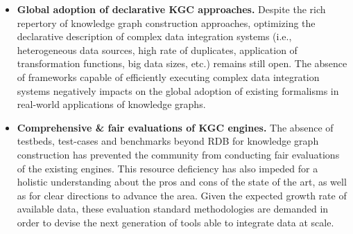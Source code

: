 \begin{itemize}
    \item \textbf{Global adoption of declarative KGC approaches.} Despite the rich repertory of knowledge graph construction approaches, optimizing the declarative description of complex data integration systems (i.e., heterogeneous data sources, high rate of duplicates, application of transformation functions, big data sizes, etc.) remains still open. The absence of frameworks capable of efficiently executing complex data integration systems negatively impacts on the global adoption of existing formalisms in real-world applications of knowledge graphs.
    \item \textbf{Comprehensive \& fair evaluations of KGC engines.} The absence of testbeds, test-cases and benchmarks beyond RDB for knowledge graph construction has prevented the community from conducting fair evaluations of the existing engines. This resource deficiency has also impeded for a holistic understanding about the pros and cons of the state of the art, as well as for clear directions to advance the area. Given the expected growth rate of available data, these evaluation standard methodologies are demanded in order to devise the next generation of tools able to integrate data at scale.
\end{itemize}